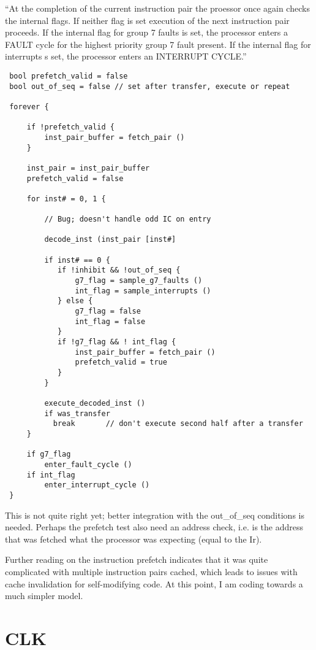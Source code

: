 \documentclass[notitlepage]{report}
\begin{document}
``At the completion of the current instruction pair the proessor once again
checks the internal flags. If neither flag is set execution of the next
instruction pair proceeds. If the internal flag for group 7 faults is set,
the processor enters a FAULT cycle for the highest priority group 7
fault present. If the internal flag for interrupts s set, the processor
enters an INTERRUPT CYCLE.''

\begin {lstlisting}
 bool prefetch_valid = false
 bool out_of_seq = false // set after transfer, execute or repeat

 forever {

     if !prefetch_valid {
         inst_pair_buffer = fetch_pair ()
     }

     inst_pair = inst_pair_buffer
     prefetch_valid = false

     for inst# = 0, 1 {

         // Bug; doesn't handle odd IC on entry

         decode_inst (inst_pair [inst#]   

         if inst# == 0 {
            if !inhibit && !out_of_seq {
                g7_flag = sample_g7_faults ()
                int_flag = sample_interrupts ()
            } else {
                g7_flag = false
                int_flag = false
            }
            if !g7_flag && ! int_flag {
                inst_pair_buffer = fetch_pair ()
                prefetch_valid = true
            }
         }

         execute_decoded_inst ()
         if was_transfer
           break       // don't execute second half after a transfer
     }

     if g7_flag
         enter_fault_cycle ()
     if int_flag
         enter_interrupt_cycle ()
 }
\end{lstlisting}

This is not quite right yet; better integration with the out\_of\_seq
conditions is needed. Perhaps the prefetch test also need an address
check, i.e. is the address that was fetched what the processor was
expecting (equal to the Ir).

Further reading on the instruction prefetch indicates that it was quite complicated with multiple instruction pairs cached, which leads to issues with cache invalidation for self-modifying code. At this point, I am coding towards a much simpler model.

\section {CLK}
\end{document}
